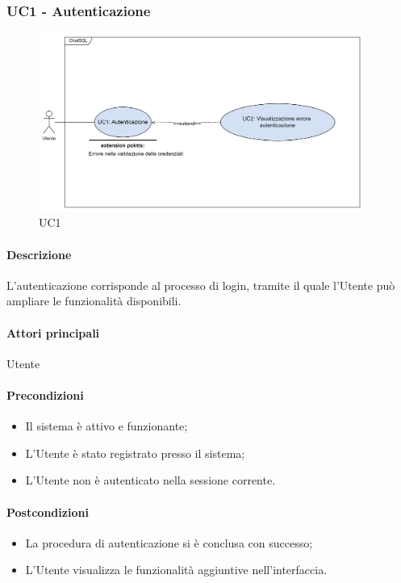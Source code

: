 \subsubsection{UC1 - Autenticazione}\label{UC1}

\begin{figure}[H]
  \centering
  \includegraphics[width=0.95\textwidth]{assets/uc1.png}
  \caption{UC1}
\end{figure}

\paragraph*{Descrizione}
L'autenticazione corrisponde al processo di login, tramite il quale l'Utente può ampliare le funzionalità disponibili.

\paragraph*{Attori principali}
Utente

\paragraph*{Precondizioni}
\begin{itemize}
  \item Il sistema è attivo e funzionante;
  \item L'Utente è stato registrato presso il sistema;
  \item L'Utente non è autenticato nella sessione corrente.
\end{itemize}

\paragraph*{Postcondizioni}
\begin{itemize}
  \item La procedura di autenticazione si è conclusa con successo;
  \item L'Utente visualizza le funzionalità aggiuntive nell'interfaccia.  
\end{itemize}


